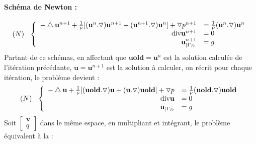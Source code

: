 \documentclass{book}
\begin{document}
\paragraph{Schéma de Newton :}
\[
(N)\hspace{0.25cm}\left\{
\begin{array}{rl}
-\bigtriangleup \textbf{u}^{n+1} + \frac{1}{\nu}[( \textbf{u}^n. \triangledown) \textbf{u}^{n+1}+ (\textbf{u}^{n+1} .\triangledown) \textbf{u}^n] + \triangledown p^{n+1} &=\frac{1}{\nu}(\textbf{u}^n.\triangledown)\textbf{u}^n \\
\text{div}\textbf{u}^{n+1}          &=0 \\
\textbf{u}^{n+1}_{|\Gamma_D}  &=g
\end{array}\right.
\]
Partant de ce schémas, en affectant que $\textbf{uold}=\textbf{u}^{n}$ est la solution calculée de l'itération précédante, $\textbf{u}=\textbf{u}^{n+1}$ est la solution à calculer, on récrit pour chaque itération, le problème devient : 
\[
(N)\hspace{0.25cm}\left\{
\begin{array}{rl}
-\bigtriangleup \textbf{u} + \frac{1}{\nu}[( \textbf{uold}. \triangledown) \textbf{u}+ (\textbf{u} .\triangledown) \textbf{uold}] + \triangledown p &=\frac{1}{\nu}(\textbf{uold}.\triangledown)\textbf{uold} \\
\text{div}\textbf{u}          &=0 \\
\textbf{u}_{|\Gamma_D}  &=g
\end{array}\right.
\]
Soit $\left[\begin{array}{cc} \textbf{v}\\ q\end{array}\right]$ dans le même espace, en multipliant et intégrant, le problème équivalent à la :
\end{document}
